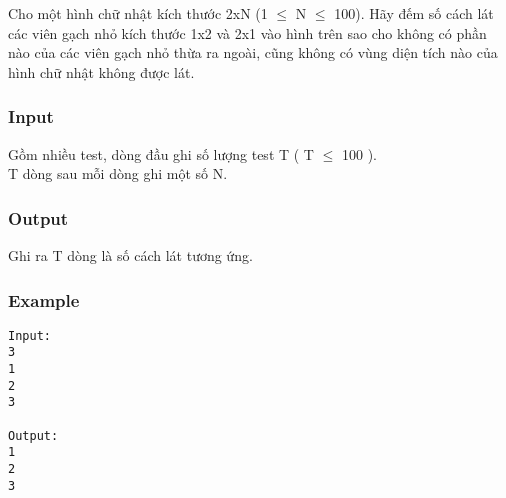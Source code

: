 



   Cho một hình chữ nhật kích thước 2xN (1 $\le$ N $\le$ 100). Hãy đếm số cách lát các viên gạch nhỏ kích thước 1x2 và 2x1 vào hình trên sao cho không có phần nào của các viên gạch nhỏ thừa ra ngoài, cũng không có vùng diện tích nào của hình chữ nhật không được lát.  

\subsubsection{   Input  }

   Gồm nhiều test, dòng đầu ghi số lượng test T ( T $\le$ 100 ).   
\\   T dòng sau mỗi dòng ghi một số N.  

\subsubsection{   Output  }

   Ghi ra T dòng là số cách lát tương ứng.  

\subsubsection{   Example  }
\begin{verbatim}
Input:
3
1
2
3

Output:
1
2
3
\end{verbatim}
